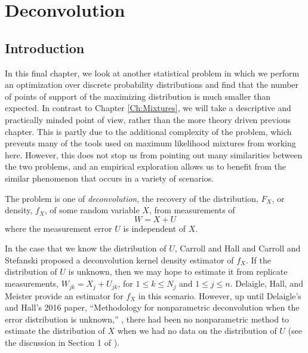 \chapter{Deconvolution}
\label{Ch:Deconvolution}




\section{Introduction}
	In this final chapter, we look at another statistical problem in which we perform an optimization over discrete probability distributions and find that the number of points of support of the maximizing distribution is much smaller than expected. In contrast to Chapter \ref{Ch:Mixtures}, we will take a descriptive and practically minded point of view, rather than the more theory driven previous chapter. This is partly due to the additional complexity of the problem, which prevents many of the tools used on maximum likelihood mixtures from working here. However, this does not stop us from pointing out many similarities between the two problems, and an empirical exploration allows us to benefit from the similar phenomenon that occurs in a variety of scenarios.

	The problem is one of \emph{deconvolution}, the recovery of the distribution, $F_X$, or density, $f_X$, of some random variable $X$, from measurements of
	\begin{equation}
		W = X + U
	\end{equation}
	where the measurement error $U$ is independent of $X$. 

	In the case that we know the distribution of $U$, Carroll and Hall \cite{Carroll1988-aj} and Carroll and Stefanski \cite{Stefanski1990-uo} proposed a deconvolution kernel density estimator of $f_X$. If the distribution of $U$ is unknown, then we may hope to estimate it from replicate measurements, $W_{jk} = X_j + U_{jk}$, for $1 \leq k \leq N_j$ and $1 \leq j \leq n$. Delaigle, Hall, and Meister provide an estimator for $f_X$ in this scenario. However, up until Delaigle's and Hall's 2016 paper, ``Methodology for nonparametric deconvolution when the error distribution is unknown,'' \cite{Delaigle2016-la}, there had been no nonparametric method to estimate the distribution of $X$ when we had no data on the distribution of $U$ (see the discussion in Section 1 of \cite{Delaigle2016-la}).

